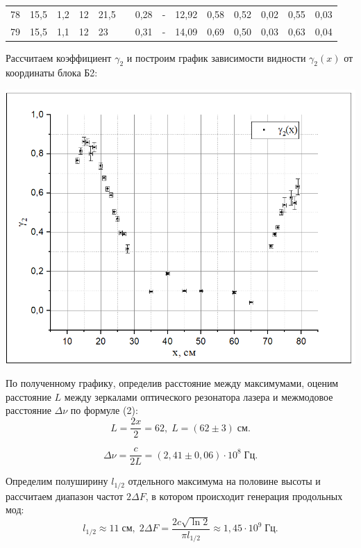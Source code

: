 \documentclass[a4paper,12pt]{report}
\begin{document}
\begin{table}[H]
\begin{center}
\begin{tabular}{|p{0.8cm}|p{0.6cm}|p{0.6cm}|p{0.6cm}|p{0.6cm}|c|c|c|c|c|c|c|c|c|}
78    & 15,5    & 1,2     & 12      & 21,5    &                        & 0,28  & -        & 12,92 & 0,58        & 0,52         & 0,02               & 0,55         & 0,03               \\ \cline{1-5} \cline{7-14} 
79    & 15,5    & 1,1     & 12      & 23      &                        & 0,31  & -        & 14,09 & 0,69        & 0,50         & 0,03               & 0,63         & 0,04               \\ \hline
\end{tabular}
\end{center}
\end{table}

Рассчитаем коэффициент $\gamma_2$ и построим график зависимости видности $\gamma_2(x)$ от координаты блока Б2:

\begin{center}
    \includegraphics[width =0.8 \linewidth]{gamma2(x).png}
\end{center}
	
По полученному графику, определив расстояние между максимумами, оценим расстояние $L$ между зеркалами оптического резонатора лазера  и межмодовое расстояние $\Delta\nu$ по формуле (2):
		\begin{equation*}
		L = \frac{2x}{2} = 62,\; L = (62\pm 3) \; \text{см}.
		\end{equation*}
		
		\begin{equation*}
	    \Delta\nu = \frac{c}{2L} = (2,41\pm 0,06)\cdot 10^8 \; \text{Гц}.
		\end{equation*}
		
Определим полуширину $l_{1/2}$ отдельного максимума на половине высоты и рассчитаем диапазон частот $2\Delta F$, в котором происходит генерация продольных мод:
		\begin{equation}
		l_{1/2} \approx 11\; \text{см}, \; 2\Delta F = \frac{2c\sqrt{\ln 2}}{\pi l_{1/2}} \approx 1,45\cdot 10^9 \; \text{Гц}.
		\end{equation}
		
\end{document}
